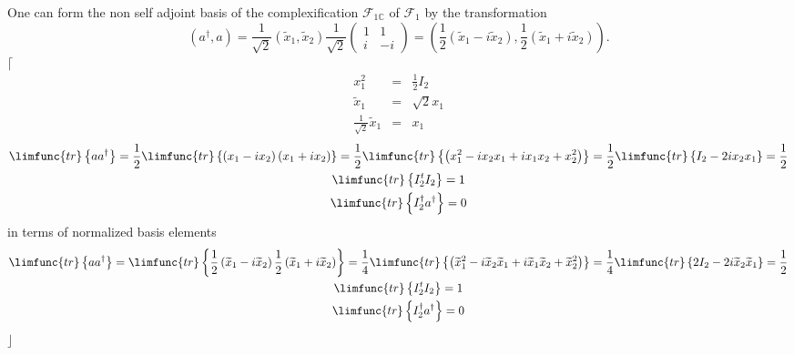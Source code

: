 \documentclass[aps,preprint]{revtex4}
\begin{document}
One can form the non self adjoint basis of the complexification $\mathcal{F}%
_{1\mathbb{C}}$ of $\mathcal{F}_{1}$ by the transformation 
\begin{equation}
\left( a^{\dagger },a\right) =\frac{1}{\sqrt{2}}\left( \widetilde{x}_{1},%
\widetilde{x}_{2}\right) \frac{1}{\sqrt{2}}\left( 
\begin{array}{cc}
1 & 1 \\ 
i & -i%
\end{array}%
\right) =\left( \frac{1}{2}\left( \widetilde{x}_{1}-i\widetilde{x}%
_{2}\right) ,\frac{1}{2}\left( \widetilde{x}_{1}+i\widetilde{x}_{2}\right)
\right) .
\end{equation}%
$\lceil $%
\begin{eqnarray}
x_{1}^{2} &=&\frac{1}{2}I_{2} \\
\widetilde{x}_{1} &=&\sqrt{2}x_{1} \\
\frac{1}{\sqrt{2}}\widetilde{x}_{1} &=&x_{1}
\end{eqnarray}%
\begin{gather}
\limfunc{tr}\left\{ aa^{\dagger }\right\} =\frac{1}{2}\limfunc{tr}\left\{
\left( x_{1}-ix_{2}\right) \left( x_{1}+ix_{2}\right) \right\} =\frac{1}{2}%
\limfunc{tr}\left\{ \left(
x_{1}^{2}-ix_{2}x_{1}+ix_{1}x_{2}+x_{2}^{2}\right) \right\} =\frac{1}{2}%
\limfunc{tr}\left\{ I_{2}-2ix_{2}x_{1}\right\} =\frac{1}{2} \\
\limfunc{tr}\left\{ I_{2}^{t}I_{2}\right\} =1 \\
\limfunc{tr}\left\{ I_{2}^{\dagger }a^{\dagger }\right\} =0
\end{gather}%
in terms of normalized basis elements 
\begin{gather}
\limfunc{tr}\left\{ aa^{\dagger }\right\} =\limfunc{tr}\left\{ \frac{1}{2}%
\left( \widetilde{x}_{1}-i\widetilde{x}_{2}\right) \frac{1}{2}\left( 
\widetilde{x}_{1}+i\widetilde{x}_{2}\right) \right\} =\frac{1}{4}\limfunc{tr}%
\left\{ \left( \widetilde{x}_{1}^{2}-i\widetilde{x}_{2}\widetilde{x}_{1}+i%
\widetilde{x}_{1}\widetilde{x}_{2}+\widetilde{x}_{2}^{2}\right) \right\} =%
\frac{1}{4}\limfunc{tr}\left\{ 2I_{2}-2i\widetilde{x}_{2}\widetilde{x}%
_{1}\right\} =\frac{1}{2} \\
\limfunc{tr}\left\{ I_{2}^{t}I_{2}\right\} =1 \\
\limfunc{tr}\left\{ I_{2}^{\dagger }a^{\dagger }\right\} =0
\end{gather}%
$\rfloor $
\end{document}
